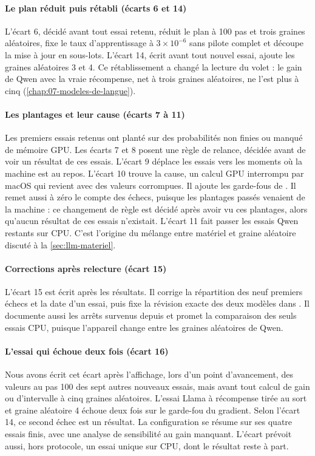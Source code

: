 \paragraph{Le plan réduit puis rétabli (écarts 6 et 14)} L'écart 6, décidé avant tout essai retenu,
réduit le plan à 100 pas et trois graines aléatoires, fixe le taux d'apprentissage à $3 \times
10^{-6}$ sans pilote complet et découpe la mise à jour en sous-lots. L'écart 14, écrit
avant tout nouvel essai, ajoute les graines aléatoires 3 et 4. Ce rétablissement a
changé la lecture du volet : le gain de Qwen avec la vraie récompense, net à trois graines
aléatoires, ne l'est plus à cinq (\cref{chap:07-modeles-de-langue}).

\paragraph{Les plantages et leur cause (écarts 7 à 11)} Les premiers essais retenus ont planté sur
des probabilités non finies ou manqué de mémoire GPU. Les écarts 7 et 8 posent une règle de relance,
décidée avant de voir un résultat de ces essais. L'écart 9 déplace les essais vers les moments où la machine est au repos. L'écart
10 trouve la cause, un calcul GPU interrompu par macOS qui revient avec des valeurs corrompues. Il
ajoute les garde-fous de . Il remet aussi à zéro le compte des échecs, puisque les
plantages passés venaient de la machine : ce changement de règle est décidé après avoir vu ces
plantages, alors qu'aucun résultat de ces essais n'existait. L'écart 11 fait passer les essais Qwen
restants sur CPU. C'est l'origine du mélange entre matériel et graine aléatoire discuté à la
\cref{sec:llm-materiel}.

\paragraph{Corrections après relecture (écart 15)} L'écart 15 est écrit après les
résultats. Il corrige la répartition des neuf premiers échecs et la date d'un essai, puis fixe
la révision exacte des deux modèles dans . Il documente aussi les arrêts survenus depuis
et promet la comparaison des seuls essais CPU, puisque l'appareil change entre les graines
aléatoires de Qwen.

\paragraph{L'essai qui échoue deux fois (écart 16)} Nous avons écrit cet écart
après l'affichage, lors d'un point d'avancement, des valeurs au pas 100 des sept autres nouveaux
essais, mais avant tout calcul de gain ou d'intervalle à cinq graines aléatoires. L'essai Llama à récompense tirée au sort et
graine aléatoire 4 échoue deux fois sur le garde-fou du gradient. Selon l'écart 14, ce second échec
est un résultat. La configuration se résume sur ses quatre essais finis, avec une analyse de
sensibilité au gain manquant. L'écart prévoit aussi, hors protocole, un essai unique sur CPU, dont
le résultat reste à part.

